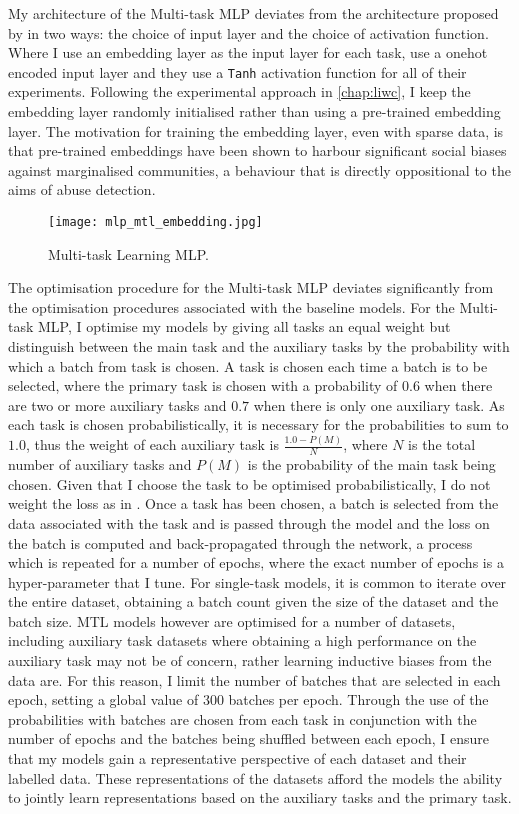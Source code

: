 My architecture of the Multi-task MLP deviates from the architecture proposed by \citet{Waseem:2018} in two ways: the choice of input layer and the choice of activation function.
Where I use an embedding layer as the input layer for each task, \citet{Waseem:2018} use a onehot encoded input layer and they use a \texttt{Tanh} activation function for all of their experiments.
Following the experimental approach in \cref{chap:liwc}, I keep the embedding layer randomly initialised rather than using a pre-trained embedding layer.
The motivation for training the embedding layer, even with sparse data, is that pre-trained embeddings have been shown to harbour significant social biases against marginalised communities, a behaviour that is directly oppositional to the aims of abuse detection.

\begin{figure}
  \centering
  \texttt{[image: mlp\_mtl\_embedding.jpg]}
  \caption{Multi-task Learning MLP.}
  \label{fig:mlp_mtl}
\end{figure}

The optimisation procedure for the Multi-task MLP deviates significantly from the optimisation procedures associated with the baseline models.
For the Multi-task MLP, I optimise my models by giving all tasks an equal weight but distinguish between the main task and the auxiliary tasks by the probability with which a batch from task is chosen.
A task is chosen each time a batch is to be selected, where the primary task is chosen with a probability of $0.6$ when there are two or more auxiliary tasks and $0.7$ when there is only one auxiliary task.
As each task is chosen probabilistically, it is necessary for the probabilities to sum to $1.0$, thus the weight of each auxiliary task is $\frac{1.0-P(M)}{N}$, where $N$ is the total number of auxiliary tasks and $P(M)$ is the probability of the main task being chosen.
Given that I choose the task to be optimised probabilistically, I do not weight the loss as in \citet{Rajamanickam:2020}.
Once a task has been chosen, a batch is selected from the data associated with the task and is passed through the model and the loss on the batch is computed and back-propagated through the network, a process which is repeated for a number of epochs, where the exact number of epochs is a hyper-parameter that I tune.
For single-task models, it is common to iterate over the entire dataset, obtaining a batch count given the size of the dataset and the batch size.
MTL models however are optimised for a number of datasets, including auxiliary task datasets where obtaining a high performance on the auxiliary task may not be of concern, rather learning inductive biases from the data are.
For this reason, I limit the number of batches that are selected in each epoch, setting a global value of $300$ batches per epoch.
Through the use of the probabilities with batches are chosen from each task in conjunction with the number of epochs and the batches being shuffled between each epoch, I ensure that my models gain a representative perspective of each dataset and their labelled data.
These representations of the datasets afford the models the ability to jointly learn representations based on the auxiliary tasks and the primary task.

